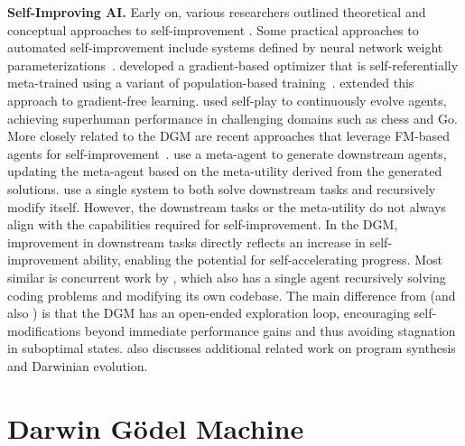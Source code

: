 \documentclass{article}
\begin{document}
\textbf{Self-Improving AI.}
Early on, various researchers outlined theoretical and conceptual approaches to self-improvement \citep{good1966speculations, schmidhuber1987evolutionary, schmidhuber2007godel}. Some practical approaches to automated self-improvement include systems defined by neural network weight parameterizations~\citep{schmidhuber1993self, hall2007self, hobbhahn2025swebenchmini, kirsch2022self, irie2022modern, irie2025metalearning, lu2023arbitrary, havrilla2024glore}. \citet{metz2021training} developed a gradient-based optimizer that is self-referentially meta-trained using a variant of population-based training~\citep{jaderberg2017population}. \citet{lange2023discovering} extended this approach to gradient-free learning. \citet{silver2017mastering} used self-play to continuously evolve agents, achieving superhuman performance in challenging domains such as chess and Go. More closely related to the DGM are recent approaches that leverage FM-based agents for self-improvement~\citep{yin2024g, robeyns2025self, hu2024self, zelikman2024self, huang2022large, singh2023beyond}. \citet{zelikman2024self} use a meta-agent to generate downstream agents, updating the meta-agent based on the meta-utility derived from the generated solutions. \citet{yin2024g} use a single system to both solve downstream tasks and recursively modify itself. However, the downstream tasks or the meta-utility do not always align with the capabilities required for self-improvement. In the DGM, improvement in downstream tasks directly reflects an increase in self-improvement ability, enabling the potential for self-accelerating progress. Most similar is concurrent work by \citet{robeyns2025self}, which also has a single agent recursively solving coding problems and modifying its own codebase. The main difference from \citet{robeyns2025self} (and also \citet{zelikman2024self, yin2024g}) is that the DGM has an open-ended exploration loop, encouraging self-modifications beyond immediate performance gains and thus avoiding stagnation in suboptimal states.  also discusses additional related work on program synthesis and Darwinian evolution.


\section{Darwin G\"odel Machine}
\label{sec:methods}
\end{document}
